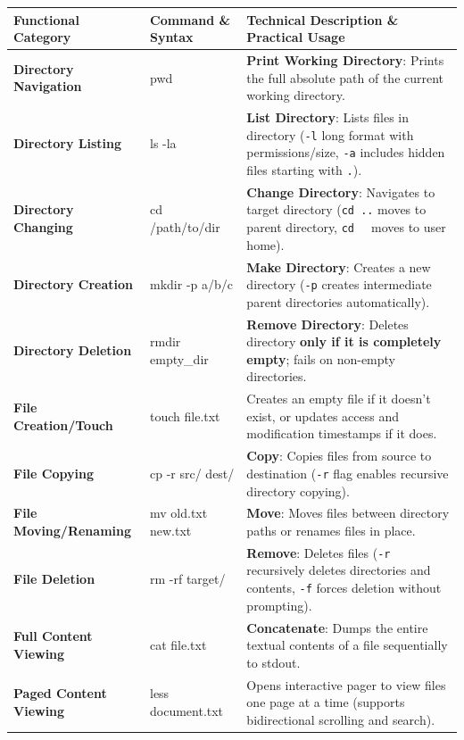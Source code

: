 \begin{table}[htbp]
\centering
\footnotesize
\renewcommand{\arraystretch}{1.25}
\begin{tabularx}{\linewidth}{l>{\ttfamily}p{2.8cm}>{\raggedright\arraybackslash}X}
\toprule
\textbf{Functional Category} & \textbf{Command \& Syntax} & \textbf{Technical Description \& Practical Usage} \\
\midrule
\textbf{Directory Navigation} & pwd & \textbf{Print Working Directory}: Prints the full absolute path of the current working directory. \\
\textbf{Directory Listing} & ls -la & \textbf{List Directory}: Lists files in directory (\texttt{-l} long format with permissions/size, \texttt{-a} includes hidden files starting with \texttt{.}). \\
\textbf{Directory Changing} & cd /path/to/dir & \textbf{Change Directory}: Navigates to target directory (\texttt{cd ..} moves to parent directory, \texttt{cd ~} moves to user home). \\
\textbf{Directory Creation} & mkdir -p a/b/c & \textbf{Make Directory}: Creates a new directory (\texttt{-p} creates intermediate parent directories automatically). \\
\textbf{Directory Deletion} & rmdir empty\_dir & \textbf{Remove Directory}: Deletes directory \textbf{only if it is completely empty}; fails on non-empty directories. \\
\textbf{File Creation/Touch} & touch file.txt & Creates an empty file if it doesn't exist, or updates access and modification timestamps if it does. \\
\textbf{File Copying} & cp -r src/ dest/ & \textbf{Copy}: Copies files from source to destination (\texttt{-r} flag enables recursive directory copying). \\
\textbf{File Moving/Renaming} & mv old.txt new.txt & \textbf{Move}: Moves files between directory paths or renames files in place. \\
\textbf{File Deletion} & rm -rf target/ & \textbf{Remove}: Deletes files (\texttt{-r} recursively deletes directories and contents, \texttt{-f} forces deletion without prompting). \\
\textbf{Full Content Viewing} & cat file.txt & \textbf{Concatenate}: Dumps the entire textual contents of a file sequentially to stdout. \\
\textbf{Paged Content Viewing} & less document.txt & Opens interactive pager to view files one page at a time (supports bidirectional scrolling and search). \\

\end{tabularx}
\end{table}
